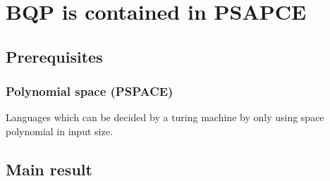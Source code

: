 \documentclass[../main.tex]{subfiles}
\begin{document}
\section{BQP is contained in PSAPCE}

\subsection{Prerequisites}

\subsubsection{Polynomial space (PSPACE)}

Languages which can be decided by a turing machine by only using space polynomial in input size.

\subsection{Main result}
\end{document}
